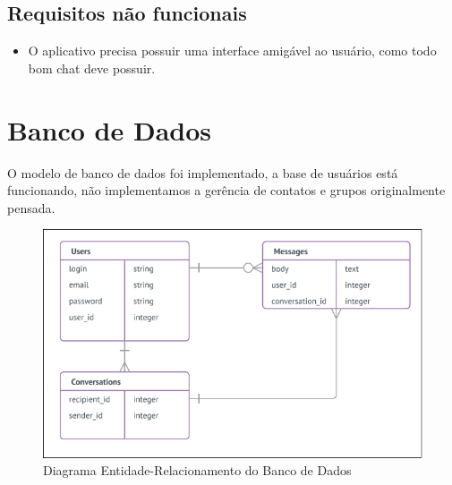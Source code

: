 \documentclass[11pt,a4paper,titlepage]{article}
\begin{document}
\subsection{Requisitos não funcionais}
\begin{itemize}
\item O aplicativo precisa possuir uma interface amigável ao usuário, como todo bom chat deve possuir.
\end{itemize}

\section{Banco de Dados}

O modelo de banco de dados foi implementado, a base de usuários está funcionando, não implementamos a gerência de contatos e grupos originalmente pensada.
\begin{figure}[!ht]
	\centering
	\includegraphics[scale=0.7]{img/db.png}
	\caption{Diagrama Entidade-Relacionamento do Banco de Dados}
\end{figure}
\pagebreak
\end{document}
